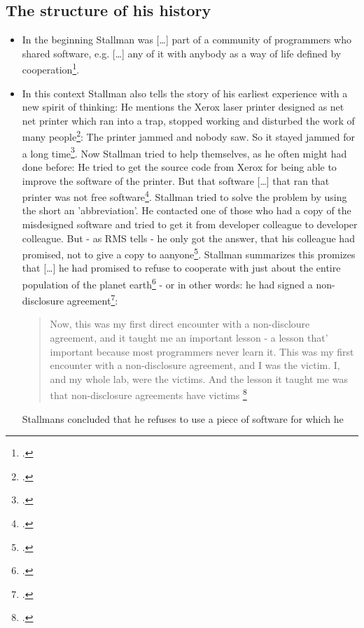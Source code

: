 \documentclass[DIV=calc,BCOR=5mm,11pt,headings=small,oneside,abstract=true, toc=bib]{scrartcl}
\begin{document}
\subsection{The structure of his history}

\begin{itemize}
  \item In the beginning Stallman was \glqq{}[\ldots] part of a community
  of programmers who shared software\grqq{}, e.g. \glqq{}[\ldots] any of
  it with anybody\grqq{} as a \glqq{}way of life\grqq{} defined by
  \glqq{}cooperation\grqq{}\footcite[cf][157]{Stallman2001a}.
  \item In this context Stallman also tells the story of his earliest experience
  with a new spirit of thinking: He mentions the Xerox laser printer
  designed as net net printer which ran into a trap, stopped working and
  disturbed the work of many people\footcite[cf][157]{Stallman2001a}:
  \glqq{}The printer jammed and nobody saw. So it stayed jammed for a
  long time\grqq{}\footcite[][157]{Stallman2001a}. Now Stallman tried to help
  themselves, as he often might had done before: He tried to get the source code
  from Xerox for being able to improve the software of the printer. But that
  software \glqq{}[\ldots] that ran that printer was not free
  software\grqq{}\footcite[][158]{Stallman2001a}. Stallman tried to solve the
  problem by using the short an 'abbreviation'. He contacted one of those who
  had a copy of the misdesigned software and tried to get it from developer
  colleague to developer colleague. But - as RMS tells - he only got the answer,
  that his colleague had promised, not to give a copy to
  aanyone\footcite[cf][158]{Stallman2001a}. Stallman summarizes this promizes
  that \glqq{}[\ldots] he had promised to refuse to cooperate with just about
  the entire population of the planet
  earth\grqq{}\footcite[cf][158]{Stallman2001a} - or in other words: \glqq{}he
  had signed a non-disclosure agreement\grqq{}\footcite[][158]{Stallman2001a}:
  \begin{quote}
  \glqq{} Now, this was my first direct encounter with a non-discloure agreement,
  and it taught me an important lesson - a lesson that' important because most
  programmers never learn it. This was my first encounter with a non-disclosure
  agreement, and I was the victim. I, and my whole lab, were the victims. And the
  lesson it taught me was that non-disclosure agreements have victims
  \grqq{}\footcite[][158]{Stallman2001a}
  \end{quote}
  Stallmans concluded that he refuses to use a piece of software for which he

\end{itemize}
\end{document}
